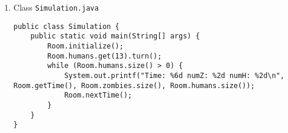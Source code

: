 \begin{enumerate}
\item Class \texttt{Simulation.java}

\lstset{language=java,tabsize=2}
\begin{lstlisting}
public class Simulation {
	public static void main(String[] args) {
		Room.initialize();
		Room.humans.get(13).turn();
		while (Room.humans.size() > 0) {
			System.out.printf("Time: %6d numZ: %2d numH: %2d\n", Room.getTime(), Room.zombies.size(), Room.humans.size());
			Room.nextTime();
		}
	}
}
\end{lstlisting}

\end{enumerate}
